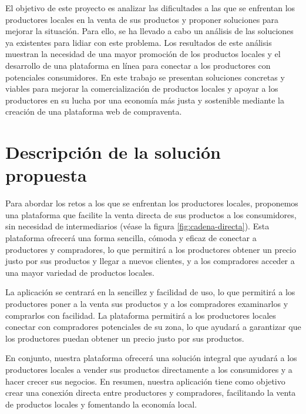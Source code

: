 
El objetivo de este proyecto es analizar las dificultades a las que se enfrentan los productores locales en la venta de sus productos y proponer soluciones para mejorar la situación. Para ello, se ha llevado a cabo un análisis de las soluciones ya existentes para lidiar con este problema. Los resultados de este análisis muestran la necesidad de una mayor promoción de los productos locales y el desarrollo de una plataforma en línea para conectar a los productores con  potenciales consumidores. En este trabajo se presentan soluciones concretas y viables para mejorar la comercialización de productos locales y apoyar a los productores en su lucha por una economía más justa y sostenible mediante la creación de una plataforma web de compraventa.

\section{Descripción de la solución propuesta}\label{sec:descripcion-solucion}

Para abordar los retos a los que se enfrentan los productores locales, proponemos una plataforma que facilite la venta directa de sus productos a los consumidores, sin necesidad de intermediarios (véase la figura \ref{fig:cadena-directa}). Esta plataforma ofrecerá una forma sencilla, cómoda y eficaz de conectar a productores y compradores, lo que permitirá a los productores obtener un precio justo por sus productos y llegar a nuevos clientes, y a los compradores acceder a una mayor variedad de productos locales. 


La aplicación se centrará en la sencillez y facilidad de uso, lo que permitirá a los productores poner a la venta sus productos y a los compradores examinarlos y comprarlos con facilidad. La plataforma permitirá a los productores locales conectar con compradores potenciales de su zona, lo que ayudará a garantizar que los productores puedan obtener un precio justo por sus productos.

En conjunto, nuestra plataforma ofrecerá una solución integral que ayudará a los productores locales a vender sus productos directamente a los consumidores y a hacer crecer sus negocios. En resumen, nuestra aplicación tiene como objetivo crear una conexión directa entre productores y compradores, facilitando la venta de productos locales y fomentando la economía local.